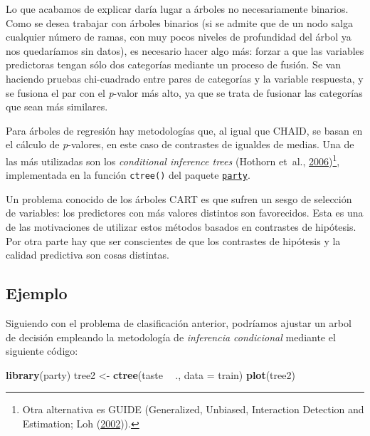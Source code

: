 \documentclass[
  spanish,
]{book}
\newenvironment{Shaded}{\begin{snugshade}}{\end{snugshade}}
\newcommand{\DataTypeTok}[1]{\textcolor[rgb]{0.13,0.29,0.53}{#1}}
\newcommand{\KeywordTok}[1]{\textcolor[rgb]{0.13,0.29,0.53}{\textbf{#1}}}
\newcommand{\NormalTok}[1]{#1}
\newcommand{\OperatorTok}[1]{\textcolor[rgb]{0.81,0.36,0.00}{\textbf{#1}}}
\newcommand{\StringTok}[1]{\textcolor[rgb]{0.31,0.60,0.02}{#1}}
\theoremstyle{break}
\theoremstyle{definition}
\theoremstyle{definition}
\theoremstyle{definition}
\theoremstyle{remark}
\begin{document}
Lo que acabamos de explicar daría lugar a árboles no necesariamente binarios.
Como se desea trabajar con árboles binarios (si se admite que de un nodo salga cualquier número de ramas, con muy pocos niveles de profundidad del árbol ya nos quedaríamos sin datos), es necesario hacer algo más: forzar a que las variables predictoras tengan sólo dos categorías mediante un proceso de fusión.
Se van haciendo pruebas chi-cuadrado entre pares de categorías y la variable respuesta, y se fusiona el par con el \emph{p}-valor más alto, ya que se trata de fusionar las categorías que sean más similares.

Para árboles de regresión hay metodologías que, al igual que CHAID, se basan en el cálculo de \emph{p}-valores, en este caso de contrastes de igualdes de medias.
Una de las más utilizadas son los \emph{conditional inference trees} (Hothorn et~al., \protect\hyperlink{ref-hothorn2006unbiased}{2006})\footnote{Otra alternativa es GUIDE (Generalized, Unbiased, Interaction Detection and Estimation; Loh (\protect\hyperlink{ref-loh2002regression}{2002})).}, implementada en la función \texttt{ctree()} del paquete \href{https://CRAN.R-project.org/package=party}{\texttt{party}}.

Un problema conocido de los árboles CART es que sufren un sesgo de selección de variables: los predictores con más valores distintos son favorecidos.
Esta es una de las motivaciones de utilizar estos métodos basados en contrastes de hipótesis.
Por otra parte hay que ser conscientes de que los contrastes de hipótesis y la calidad predictiva son cosas distintas.

\hypertarget{ejemplo-1}{%
\subsection{Ejemplo}\label{ejemplo-1}}

Siguiendo con el problema de clasificación anterior, podríamos ajustar un arbol de decisión empleando la metodología de \emph{inferencia condicional} mediante el siguiente código:

\begin{Shaded}
\begin{Highlighting}[]
\KeywordTok{library}\NormalTok{(party)}
\NormalTok{tree2 <-}\StringTok{ }\KeywordTok{ctree}\NormalTok{(taste }\OperatorTok{~}\StringTok{ }\NormalTok{., }\DataTypeTok{data =}\NormalTok{ train) }
\KeywordTok{plot}\NormalTok{(tree2)}
\end{Highlighting}
\end{Shaded}
\end{document}
